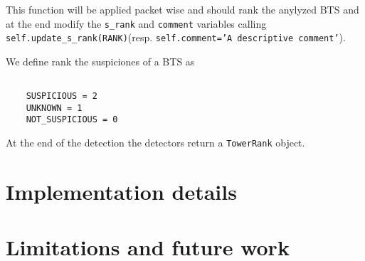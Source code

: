 \documentclass[preprint,12pt,3p]{elsarticle}
\begin{document}
This function will be applied packet wise and should rank the anylyzed BTS and at the end modify the \texttt{s\_rank} and \texttt{comment} variables calling \texttt{self.update\_s\_rank(RANK)}(resp. \texttt{self.comment='A descriptive comment'}).

We define rank the suspiciones of a BTS as
\begin{lstlisting}

    SUSPICIOUS = 2
    UNKNOWN = 1
    NOT_SUSPICIOUS = 0
\end{lstlisting}

At the end of the detection the detectors return a \texttt{TowerRank} object.




\section{Implementation details}
\section{Limitations and future work}






\end{document}
